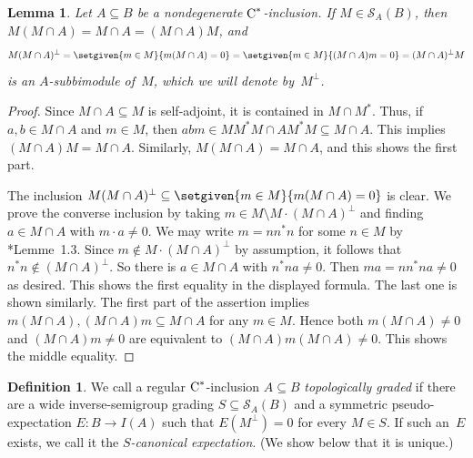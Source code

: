 \documentclass[a4paper]{amsart}
\theoremstyle{plain}
\newtheorem{lemma}[theorem]{Lemma}
\theoremstyle{definition}
\newtheorem{definition}[theorem]{Definition}
\theoremstyle{remark}
\numberwithin{theorem}{section}
\numberwithin{equation}{section}
\newcommand*{\nb}{\nobreakdash}
\newcommand*{\Cst}{\textup C^*}%
\newcommand*{\Slice}{\mathcal S}%
\begin{document}
\begin{lemma}
  \label{lem:slices_annihilators}
  Let  \(A\subseteq B\) be a  nondegenerate \(\Cst\)\nb-inclusion.
  If \(M\in\Slice_A(B)\), then \(M (M\cap A) = M\cap A = (M\cap A)M\),
  and
  \[
    M (M\cap A)^\bot
    = \setgiven{m\in M}{m(M\cap A)=0}
    = \setgiven{m\in M}{(M\cap A)m=0}
    = (M\cap A)^\bot M
  \]
  is an \(A\)\nb-subbimodule of~\(M\), which we will denote by~\(M^\bot\).
\end{lemma}

\begin{proof}
  Since  \(M\cap A\subseteq M\) is self-adjoint, it is contained in
  \(M\cap M^*\).
  Thus, if \(a,b\in M\cap A\) and \(m\in M\), then
  \(a b m\in MM^*M\cap AM^*M\subseteq M\cap A\).
  This implies \((M\cap A)M=M\cap A\).
  Similarly, \(M(M\cap A)=M\cap A\), and this shows the first part.

  The inclusion \(M(M\cap A)^\bot\subseteq \setgiven{m\in M}{m(M\cap
    A)=0}\) is clear.
  We prove the converse inclusion by taking \(m\in M\setminus M\cdot
  (M\cap A)^\bot\) and finding \(a\in M\cap A\) with \(m\cdot a \neq0\).
  We may write \(m=nn^*n\) for some \(n\in M\) by
  \cite{Blanchard:Deformations_Hopf}*{Lemme~1.3}.
  Since \(m\notin M\cdot  (M\cap A)^\bot\) by assumption,
  it follows that \(n^*n\notin (M\cap A)^\bot\).
  So there is \(a \in M\cap A\) with \(n^*n a\neq 0\).
  Then \(m a = n n^*n a\neq 0\) as desired.
  This shows the first equality in the displayed formula.
  The last one is shown similarly.
  The first part of the assertion implies \(m(M\cap A), (M\cap A) m
  \subseteq M\cap A\) for any \(m\in M\).
  Hence both \(m(M\cap A)\neq 0\) and \((M\cap A)m \neq 0\)
  are equivalent to \((M\cap A)m(M\cap A)\neq 0\).
  This shows the middle equality.
\end{proof}



\begin{definition}
  \label{def:topological_grading}
  We call a regular \(\Cst\)\nb-inclusion \(A\subseteq B\)
  \emph{topologically graded} if there are a wide inverse-semigroup
  grading \(S\subseteq \Slice_A(B)\) and a symmetric
  pseudo-expectation \(E\colon B\to I(A)\) such that \(E(M^\bot)=0\)
  for every \(M\in S\).
  If such an~\(E\) exists, we call it the  \emph{\(S\)\nb-canonical
    expectation}.  (We show below that it is unique.)
\end{definition}
\end{document}
